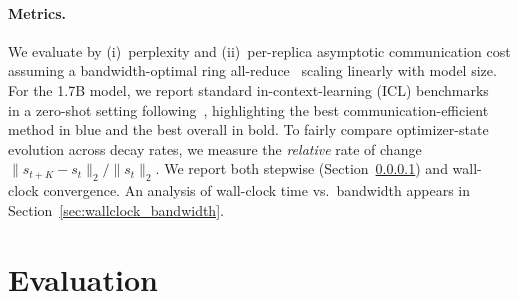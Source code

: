 \documentclass{article}
\begin{document}
\paragraph{Metrics.}
\label{sec:stepwise}
We evaluate by (i)~perplexity and (ii)~per-replica asymptotic
communication cost assuming a bandwidth-optimal ring
all-reduce~\citep{sergeev2018horovodfasteasydistributed} scaling linearly with model
size. For the 1.7B model, we report standard in-context-learning
(ICL) benchmarks~\citep{brown2020languagemodelsfewshotlearners} in a zero-shot setting
following~\citet{allal2025smollm2}, highlighting the best
communication-efficient method in blue and the best overall in bold.
To fairly compare optimizer-state evolution across decay rates, we
measure the \emph{relative} rate of change
$\|s_{t+K} - s_t\|_2 / \|s_t\|_2$. We report both stepwise
(Section~\ref{sec:stepwise}) and wall-clock convergence. An analysis of
wall-clock time vs.\ bandwidth appears in
Section~\ref{sec:wallclock_bandwidth}.



\section{Evaluation}
\label{sec:evaluation}



\end{document}
